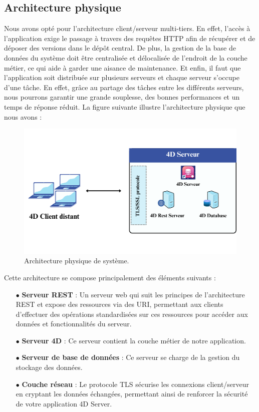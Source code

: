 \subsection{Architecture physique}

Nous avons opté pour l’architecture client/serveur multi-tiers. En effet, l’accès à l’application exige le passage à
travers des requêtes HTTP afin de récupérer et de déposer des versions dans le dépôt
central. De plus, la gestion de la base de données du système doit être centralisée et délocalisée de l’endroit de la couche métier, ce qui aide à garder une aisance de maintenance.
Et enfin, il faut que l’application soit distribuée sur plusieurs serveurs et chaque serveur
s’occupe d’une tâche. En effet, grâce au partage des tâches entre les différents serveurs,
nous pourrons garantir une grande souplesse, des bonnes performances et un temps de
réponse réduit. La figure suivante illustre l’architecture physique que nous avons :

\begin{figure}[H]
    \centering
    \includegraphics[width=15cm]{Figures/architecturePhysique.png}
    \caption{Architecture physique de système.}
\end{figure}

Cette architecture se compose principalement des éléments suivants :

\begin{itemize}
    \item[$\bullet$] \textbf{Serveur REST} : Un serveur web qui suit les principes de l'architecture REST et expose des ressources via des URI, permettant aux clients d'effectuer des opérations standardisées sur ces ressources pour accéder aux données et fonctionnalités du serveur.
    \item[$\bullet$] \textbf{Serveur 4D} : Ce serveur contient la couche métier de notre application.
    \item[$\bullet$] \textbf{Serveur de base de données} : Ce serveur se charge de la gestion du stockage des données.
    \item[$\bullet$] \textbf{Couche réseau} : Le protocole TLS sécurise les connexions client/serveur en cryptant les données échangées, permettant ainsi de renforcer la sécurité de votre application 4D Server.
\end{itemize}

